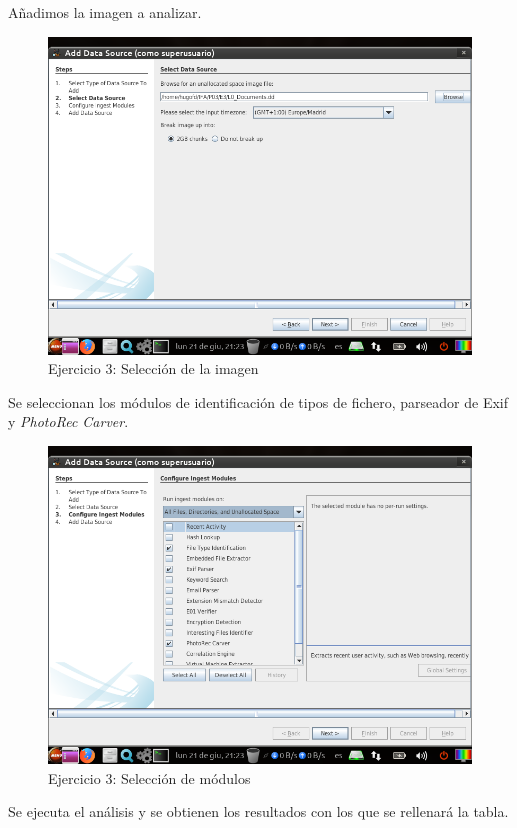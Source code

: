 \documentclass[11pt]{article}
\begin{document}
Añadimos la imagen a analizar.

\begin{figure}[H]
  \caption{Ejercicio 3: Selección de la imagen}
  \centering
  \includegraphics[scale=0.7]{e3-3.png}
\end{figure}

Se seleccionan los módulos de identificación de tipos de fichero, parseador de Exif y \textit{PhotoRec Carver}.

\begin{figure}[H]
  \caption{Ejercicio 3: Selección de módulos}
  \centering
  \includegraphics[scale=0.7]{e3-4.png}
\end{figure}

Se ejecuta el análisis y se obtienen los resultados con los que se rellenará la tabla.
\end{document}
